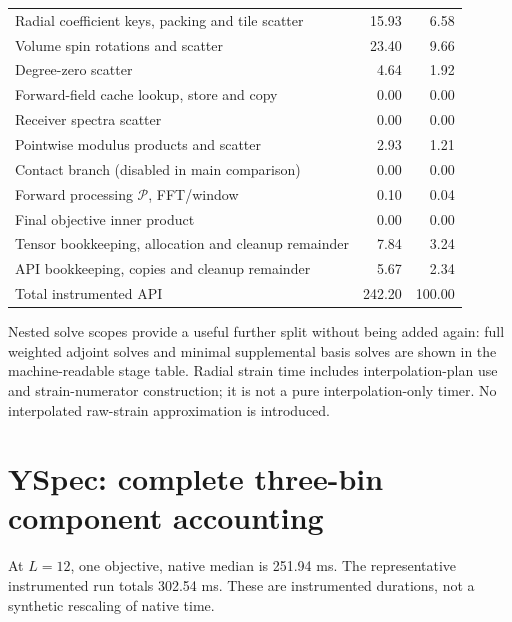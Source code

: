 \begin{center}
\begin{tabular}{p{}rr}
Radial coefficient keys, packing and tile scatter & 15.93 & 6.58\\
Volume spin rotations and scatter & 23.40 & 9.66\\
Degree-zero scatter & 4.64 & 1.92\\
Forward-field cache lookup, store and copy & 0.00 & 0.00\\
Receiver spectra scatter & 0.00 & 0.00\\
Pointwise modulus products and scatter & 2.93 & 1.21\\
Contact branch (disabled in main comparison) & 0.00 & 0.00\\
Forward processing $\mathcal P$, FFT/window & 0.10 & 0.04\\
Final objective inner product & 0.00 & 0.00\\
Tensor bookkeeping, allocation and cleanup remainder & 7.84 & 3.24\\
API bookkeeping, copies and cleanup remainder & 5.67 & 2.34\\
\midrule Total instrumented API & 242.20 & 100.00\\\bottomrule\end{tabular}\end{center}
Nested solve scopes provide a useful further split without being added again: full weighted adjoint solves and minimal supplemental basis solves are shown in the machine-readable stage table. Radial strain time includes interpolation-plan use and strain-numerator construction; it is not a pure interpolation-only timer. No interpolated raw-strain approximation is introduced.
\clearpage\section{YSpec: complete three-bin component accounting}
At $L=12$, one objective, native median is 251.94 ms. The representative instrumented run totals 302.54 ms. These are instrumented durations, not a synthetic rescaling of native time.
